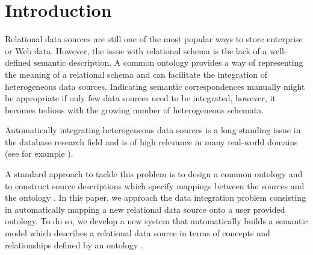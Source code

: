 \documentclass[letterpaper]{article} %
\newcommand{\ignore}[1]{}
\newcommand{\forijcai}[1]{}
\begin{document}
\section{Introduction}
\ignore{
The problem of integrating heterogeneous data sources is a long standing issue 
in the database research field and is of high relevance in many real-world 
domains (see e.g. 
\cite{Rahm:2001:SAA:767149.767154,Dhamankar:imap,Taheriyan2013}).
A common approach to tackle this problem is to design a global model and to
construct source descriptions which specify mappings between the sources and
the global model \cite{doan2012principles}.

In our case, we would like this global model to account not only for structural properties of the original data sources, but also to include the semantics, which is usually implicitly present in the sources.
In other words, we want to build a semantic model which describes the data sources in terms of concepts and relationships defined by an ontology \cite{taheriyan2016learning}.
Henceforth, we focus on a specific data integration problem: automatically mapping a new relational data source onto a user provided ontology.
}
Relational data sources are still one of the most popular ways to store enterprise or Web data. However, the issue with relational schema is the lack of a well-defined semantic description.
A common ontology provides a way of representing the meaning of a relational schema and can facilitate the integration of heterogeneous data sources\forijcai{ within a domain}.
Indicating semantic correspondences manually might be appropriate if only few data sources need to be integrated, however, it becomes tedious with the growing number of heterogeneous schemata.

Automatically integrating heterogeneous data sources is a long standing issue in the database research field and is of high relevance in many real-world 
domains (see for example \cite{Rahm:2001:SAA:767149.767154,Dhamankar:imap,Taheriyan2013}).

A standard approach to tackle this problem is to design a common ontology and to construct source descriptions which specify mappings between the sources and the ontology \cite{doan2012principles}.
In this paper, we approach the data integration problem consisting in automatically mapping a new relational data source onto a user provided ontology.
To do so, we develop a new system that automatically builds a semantic model which describes a relational data source in terms of concepts and relationships defined by an ontology \cite{taheriyan2016learning}.
\end{document}
